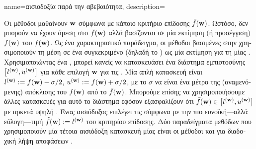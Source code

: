 {name={\foreignlanguage{greek}{αισιοδοξία παρά την αβεβαιότητα}},
	description={\foreignlanguage{greek}{Οι μέθοδοι}  
		\foreignlanguage{greek}{μαθαίνουν}  $\weights$ 
		\foreignlanguage{greek}{σύμφωνα με κάποιο κριτήριο επίδοσης $\bar{f}(\weights)$. Ωστόσο, δεν μπορούν να έχουν άμεση 
		στο $\bar{f}(\weights)$ αλλά βασίζονται σε μία εκτίμηση (ή προσέγγιση) 
		$f(\weights)$ του $\bar{f}(\weights)$. Ως ένα χαρακτηριστικό παράδειγμα, οι μέθοδοι βασιμένες στην}   
		\foreignlanguage{greek}{χρησιμοποιούν τη μέση}  \foreignlanguage{greek}{σε ένα συγκεκριμένο}  
		\foreignlanguage{greek}{(δηλαδή το} ) \foreignlanguage{greek}{ως μία εκτίμηση για τη}  
		 \foreignlanguage{greek}{μίας} . \foreignlanguage{greek}{Χρησιμοποιώντας ένα} 
		, \foreignlanguage{greek}{μπορεί κανείς να κατασκευάσει ένα διάστημα εμπιστοσύνης  
		$\big[ l^{(\weights)},  u^{(\weights)} \big]$ για κάθε επιλογή $\weights$ για τις} .
		\foreignlanguage{greek}{Μία απλή κατασκευή είναι $l^{(\weights)} \defeq f(\weights) - \sigma/2$, $u^{(\weights)} \defeq f(\weights)+ \sigma/2$, 
	    	με το $\sigma$ να είναι ένα μέτρο της (αναμενόμενης) απόκλισης του $f(\weights)$ από το $\bar{f}(\weights)$.
		Μπορούμε επίσης να χρησιμοποιήσουμε άλλες κατασκευές για αυτό το διάστημα εφόσον εξασφαλίζουν ότι 
		$\bar{f}(\weights) \in\big[ l^{(\weights)},  u^{(\weights)} \big]$ 
		με αρκετά υψηλή} . \foreignlanguage{greek}{Ένας αισιόδοξος επιλέγει τις}  
		\foreignlanguage{greek}{σύμφωνα με την πιο ευνοϊκή—αλλά εύλογη—τιμή $\tilde{f}(\weights) \defeq  l^{(\weights)}$ 
		του κριτηρίου επίδοσης. Δύο παραδείγματα μεθόδων}  \foreignlanguage{greek}{που χρησιμοποιούν μία τέτοια 
		αισιόδοξη κατασκευή μίας}  \foreignlanguage{greek}{είναι οι μέθοδοι}  \cite[\foreignlanguage{greek}{Κεφ.} 11]{ShalevMLBook} 
		\foreignlanguage{greek}{και}  \foreignlanguage{greek}{για διαδοχική λήψη αποφάσεων} \cite[Sec. 2.2]{Bubeck2012}. 
		\begin{figure}[H]
				\begin{center}
\begin{tikzpicture}[x=3cm, y=1cm]

\end{tikzpicture}
\end{center}
\end{figure}}}
